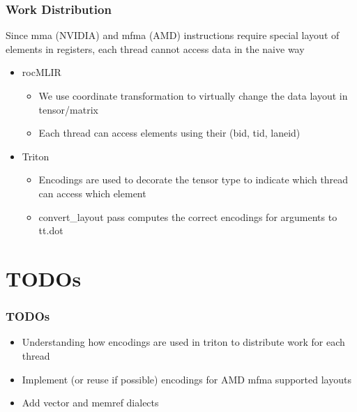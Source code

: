 \documentclass[t, pdftex, aspectratio=169]{beamer}  %
\begin{document}
\begin{frame}
  \frametitle{Work Distribution}
  Since mma (NVIDIA) and mfma (AMD) instructions require special layout of elements in registers, each thread cannot access data in the naive way
  \begin{itemize}
  \item rocMLIR
    \begin{itemize}
    \item We use coordinate transformation to virtually change the data layout in tensor/matrix
    \item Each thread can access elements using their (bid, tid, laneid)
    \end{itemize}
  \item Triton
    \begin{itemize}
    \item Encodings are used to decorate the tensor type to indicate which thread can access which element
    \item convert\_layout pass computes the correct encodings for arguments to tt.dot
    \end{itemize}
  \end{itemize}
\end{frame}
	
\section{TODOs}

\begin{frame}
  \frametitle{TODOs}
  \begin{itemize}
  \item Understanding how encodings are used in triton to distribute work for each thread
  \item Implement (or reuse if possible) encodings for AMD mfma supported layouts
  \item Add vector and memref dialects
  \end{itemize}
\end{frame}
	
\end{document}
